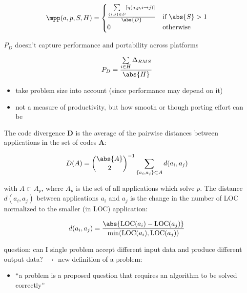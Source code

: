 \begin{definition}\label{def:pp_eff_pp}
$$\mpp(a, p, S, H) = 
        \begin{cases}
            \frac{\sum\limits_{\{i, j\} \in D} [\eta(a, p, i \rightarrow j)]}{\abs{D}} & \text{if }\abs{S} > 1 \\
            0                         & \text{otherwise}
        \end{cases}$$

\end{definition}

\newpage
\cite{daniel_applying_2019}

$P_D$ doesn't capture performance and portability across platforms

$$P_D = \frac{\sum\limits_{i \in H} \Delta_{RMS}}{\abs{H}}$$

\begin{itemize}
    \item take problem size into account (since performance may depend on it)
    \item not a measure of productivity, but how smooth or though porting effort can be
\end{itemize}

\begin{definition}\label{def:code_div}
The code divergence $\mathbf{D}$ is the average of the pairwise distances between applications in the set of codes $\mathbf{A}$:

$$D(A) = \binom{\abs{A}}{2}^{-1} \sum\limits_{\{a_i, a_j\} \subset A} d(a_i, a_j)$$

with $A \subset A_p$, where $A_p$ is the set of all applications which solve $p$. The distance $d(a_i, a_j)$ between applications $a_i$ and $a_j$ is the change in the number of LOC normalized to the smaller (in LOC) application:

$$d(a_i, a_j) = \frac{\abs{\text{LOC}(a_i) - \text{LOC}(a_j)}}{\min(\text{LOC}(a_i), \text{LOC}(a_j))}$$
    
\end{definition}

question: can I single problem accept different input data and produce different output data? $\rightarrow$ new definition of a problem:
\begin{itemize}
    \item \enquote{a problem is a proposed question that requires an algorithm to be solved correctly}
\end{itemize}

